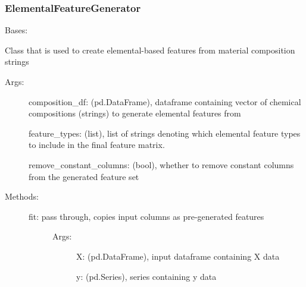 \documentclass[letterpaper,10pt,english]{sphinxmanual}
\begin{document}
\subsubsection{ElementalFeatureGenerator}
\label{\detokenize{api/mastml.feature_generators.ElementalFeatureGenerator:elementalfeaturegenerator}}\label{\detokenize{api/mastml.feature_generators.ElementalFeatureGenerator::doc}}

\begin{fulllineitems}
\label{\detokenize{api/mastml.feature_generators.ElementalFeatureGenerator:mastml.feature_generators.ElementalFeatureGenerator}}
Bases: {\hyperref[\detokenize{api/mastml.feature_generators.BaseGenerator:mastml.feature_generators.BaseGenerator}]{}}

Class that is used to create elemental-based features from material composition strings
\begin{description}
\item[{Args:}] \leavevmode
composition\_df: (pd.DataFrame), dataframe containing vector of chemical compositions (strings) to generate elemental features from

feature\_types: (list), list of strings denoting which elemental feature types to include in the final feature matrix.

remove\_constant\_columns: (bool), whether to remove constant columns from the generated feature set

\item[{Methods:}] \leavevmode\begin{description}
\item[{fit: pass through, copies input columns as pre-generated features}] \leavevmode\begin{description}
\item[{Args:}] \leavevmode
X: (pd.DataFrame), input dataframe containing X data

y: (pd.Series), series containing y data

\end{description}


\end{description}
\end{description}
\end{fulllineitems}
\end{document}
